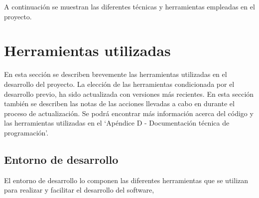 
A continuación se muestran las diferentes técnicas y herramientas empleadas en el proyecto.

\section{Herramientas utilizadas}

En esta sección se describen brevemente las herramientas utilizadas en el desarrollo del proyecto. La elección de las herramientas condicionada por el desarrollo previo, ha sido actualizada con versiones más recientes. En esta sección también se describen las notas de las acciones llevadas a cabo en durante el proceso de actualización. 
Se podrá encontrar más información acerca del código y las herramientas utilizadas en el 
`Apéndice D - Documentación técnica de programación'.


\subsection{Entorno de desarrollo}\label{sect:4_1_1_HerramientasDesarrollo}
El entorno de desarrollo lo componen las diferentes herramientas que se utilizan para realizar y facilitar el desarrollo del software,


